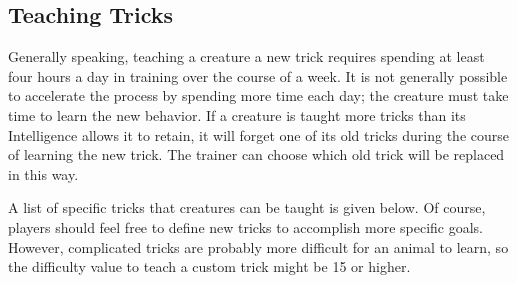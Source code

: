     \subsection{Teaching Tricks}
        Generally speaking, teaching a creature a new trick requires spending at least four hours a day in training over the course of a week.
        It is not generally possible to accelerate the process by spending more time each day; the creature must take time to learn the new behavior.
        If a creature is taught more tricks than its Intelligence allows it to retain, it will forget one of its old tricks during the course of learning the new trick.
        The trainer can choose which old trick will be replaced in this way.

        A list of specific tricks that creatures can be taught is given below.
        Of course, players should feel free to define new tricks to accomplish more specific goals.
        However, complicated tricks are probably more difficult for an animal to learn, so the difficulty value to teach a custom trick might be 15 or higher.


